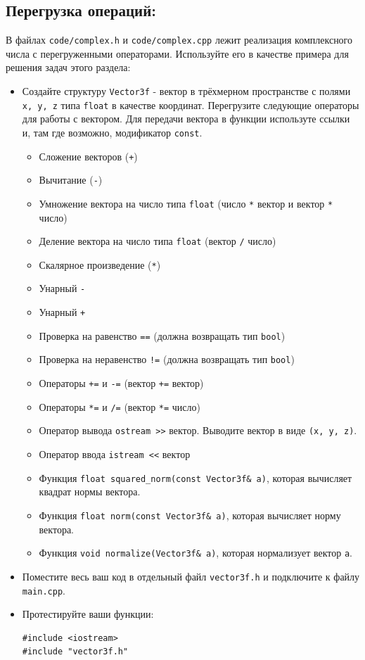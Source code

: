 \documentclass{article}
\begin{document}
\subsection*{Перегрузка операций:}
В файлах \texttt{code/complex.h} и \texttt{code/complex.cpp} лежит реализация комплексного числа с перегруженными операторами. Используйте его в качестве примера для решения задач этого раздела:
\begin{itemize}
\item Создайте структуру \texttt{Vector3f} - вектор в трёхмерном пространстве с полями \texttt{x, y, z} типа \texttt{float} в качестве координат. Перегрузите следующие операторы для работы с вектором. Для передачи вектора в функции используте ссылки и, там где возможно, модификатор \texttt{const}.
	\begin{itemize}
	\item Сложение векторов (\texttt{+})
	\item Вычитание (\texttt{-})
	\item Умножение вектора на число типа \texttt{float} (число \texttt{*} вектор и вектор \texttt{*} число)
	\item Деление вектора на число типа \texttt{float} (вектор \texttt{/} число)
	\item Скалярное произведение (\texttt{*})
	\item Унарный \texttt{-}
	\item Унарный \texttt{+}
	\item Проверка на равенство \texttt{==}  (должна возвращать тип \texttt{bool})
	\item Проверка на неравенство \texttt{!=}  (должна возвращать тип \texttt{bool})
	\item Операторы \texttt{+=} и \texttt{-=}  (вектор \texttt{+=} вектор)
	\item Операторы \texttt{*=} и \texttt{/=}  (вектор \texttt{*=} число)
	\item Оператор вывода  \texttt{ostream >{}>} вектор. Выводите вектор в виде \texttt{(x, y, z)}.
	\item Оператор ввода  \texttt{istream <{}<} вектор
	\item Функция \texttt{float squared\_norm(const Vector3f\& a)}, которая вычисляет квадрат нормы вектора.
	\item Функция \texttt{float norm(const Vector3f\& a)}, которая вычисляет норму вектора.
	\item Функция \texttt{void normalize(Vector3f\& a)}, которая нормализует вектор \texttt{a}.
	\end{itemize}
\item Поместите весь ваш код в отдельный файл \texttt{vector3f.h} и подключите к файлу \texttt{main.cpp}.
\item Протестируйте ваши функции:
\begin{lstlisting}
#include <iostream>
#include "vector3f.h"


\end{lstlisting}
\end{itemize}
\end{document}

